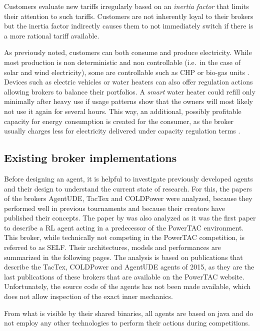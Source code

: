 Customers evaluate new tariffs irregularly based on an \emph{inertia factor} that limits
their attention to such tariffs. Customers are not inherently loyal to their brokers but the inertia factor
indirectly causes them to not immediately switch if there is a more rational tariff available.

As previously noted, customers can both consume and produce electricity. While most production is non deterministic
and non controllable (i.e.\ in the case of solar and wind electricity), some are controllable such as \ac{CHP} or
bio-gas units \citep[p.16]{ketter2018powertac}. Devices such as electric vehicles or water heaters can also offer
regulation actions allowing brokers to balance their portfolios. A \emph{smart} water heater could refill only minimally
after heavy use if usage patterns show that the owners will most likely not use it again for several hours. This
way, an additional, possibly profitable capacity for energy consumption is created for the consumer, as the broker
usually charges less for electricity delivered under capacity regulation terms \citep[p.14ff.]{ketter2018powertac}.

\subsection{Existing broker implementations}%
\label{sub:existing_broker_concepts}
Before designing an agent, it is helpful to investigate previously developed agents and their design to understand
the current state of research. For this, the papers of the brokers AgentUDE, TacTex and COLDPower were analyzed, because they
performed well in previous tournaments and because their creators have published their concepts. The
paper by \citet{peters2013reinforcement} was also analyzed as it was the first paper to describe a \ac{RL} agent acting in a predecessor
of the \ac{PowerTAC} environment. This broker, while technically not competing in the \ac{PowerTAC} competition, is
referred to as \ac{SELF}. Their architectures,
models and performances are summarized in the following pages. The analysis is based on publications that describe the
TacTex, COLDPower and AgentUDE agents of 2015, as they are the last publications of these brokers that are available on
the \ac{PowerTAC} website. Unfortunately, the source code of the agents has not been made available, which does not
allow inspection of the exact inner mechanics.

From what is visible by their shared binaries, all agents are based on java and do not employ any other technologies to
perform their actions during competitions.

